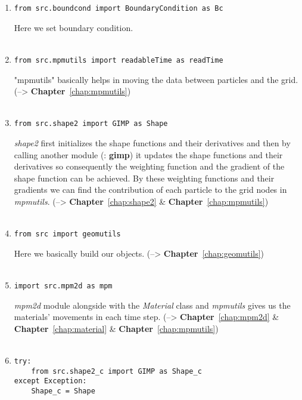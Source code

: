 \begin{enumerate}
\item 
\begin{lstlisting}
from src.boundcond import BoundaryCondition as Bc
\end{lstlisting}
Here we set boundary condition.\\ \\
\item 
\begin{lstlisting}
from src.mpmutils import readableTime as readTime
\end{lstlisting}
"mpmutils" basically helps in moving the data between particles and the grid. (--> \textbf{Chapter}~\ref{chap:mpmutils})\\ \\
\item 
\begin{lstlisting}
from src.shape2 import GIMP as Shape    
\end{lstlisting}
\emph{shape2} first initializes the shape functions and their derivatives and then by calling another module (: \textbf{gimp}) it updates the shape functions and their derivatives so consequently the weighting function and the gradient of the shape function can be achieved. By these weighting functions and their gradients we can find the
contribution of each particle to the grid nodes in \emph{mpmutils}. (--> \textbf{Chapter}~\ref{chap:shape2} \& \textbf{Chapter}~\ref{chap:mpmutils}) \\ \\
\item 
\begin{lstlisting}
from src import geomutils
\end{lstlisting}
Here we basically build our objects. (--> \textbf{Chapter}~\ref{chap:geomutils})\\ \\
\item \begin{lstlisting}
import src.mpm2d as mpm
\end{lstlisting}
\emph{mpm2d} module alongside with the \emph{Material} class and \emph{mpmutils} gives us the materials' movements in each time step. (--> \textbf{Chapter}~\ref{chap:mpm2d} \& \textbf{Chapter}~\ref{chap:material} \& \textbf{Chapter}~\ref{chap:mpmutils}) \\ \\
\item 
\begin{lstlisting}
try:
    from src.shape2_c import GIMP as Shape_c
except Exception:
    Shape_c = Shape
\end{lstlisting}

\end{enumerate}


